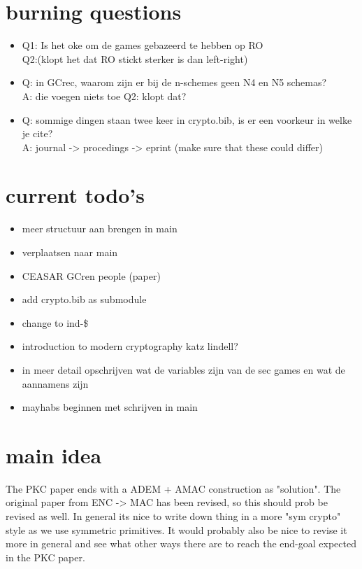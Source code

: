 \documentclass{article}
\begin{document}
\section{burning questions}
\begin{itemize}
   \item Q1: Is het oke om de games gebazeerd te hebben op RO\\
   Q2:(klopt het dat RO stickt sterker is dan left-right)
   \item Q: in GCrec, waarom zijn er bij de n-schemes geen N4 en N5 schemas? \\ A: die voegen niets toe Q2: klopt dat?
   \item Q: sommige dingen staan twee keer in crypto.bib, is er een voorkeur in welke je cite? \\ A: journal -> procedings -> eprint (make sure that these could differ)
\end{itemize}

\newpage
\section{current todo's}
\begin{itemize}
    \item meer structuur aan brengen in main
    \item verplaatsen naar main
    \item CEASAR GCren people (paper)
    \item add crypto.bib as submodule
    \item change to ind-\$
    \item introduction to modern cryptography katz lindell?
    \item in meer detail opschrijven wat de variables zijn van de sec games en wat de aannamens zijn
    \item mayhabs beginnen met schrijven in main
\end{itemize}

\newpage
\section{main idea}
The PKC paper ends with a ADEM + AMAC construction as "solution". The original paper from ENC -> MAC has been revised, so this should prob be revised as well. In general its nice to write down thing in a more "sym crypto" style as we use symmetric primitives. It would probably also be nice to revise it more in general and see what other ways there are to reach the end-goal expected in the PKC paper.
\end{document}
